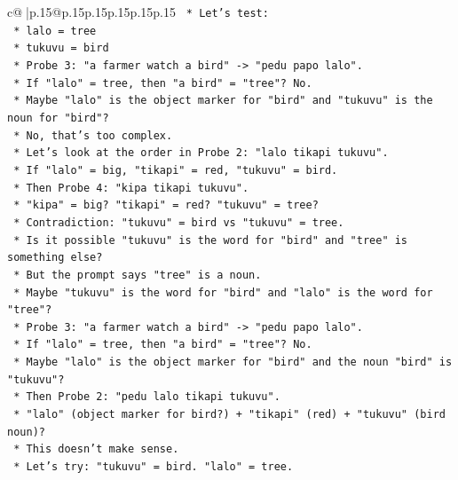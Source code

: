 \documentclass{article}
\begin{document}
{\begin{supertabular}{c@{$\;$}|p{.15\linewidth}@{}p{.15\linewidth}p{.15\linewidth}p{.15\linewidth}p{.15\linewidth}p{.15\linewidth}}
{{{\texttt{                *   Let's test:} \\
\texttt{                    *   lalo = tree} \\
\texttt{                    *   tukuvu = bird} \\
\texttt{                *   Probe 3: "a farmer watch a bird" {-}> "pedu papo lalo".} \\
\texttt{                    *   If "lalo" = tree, then "a bird" = "tree"? No.} \\
\texttt{                *   Maybe "lalo" is the object marker for "bird" and "tukuvu" is the noun for "bird"?} \\
\texttt{                *   No, that's too complex.} \\
\texttt{                *   Let's look at the order in Probe 2: "lalo tikapi tukuvu".} \\
\texttt{                *   If "lalo" = big, "tikapi" = red, "tukuvu" = bird.} \\
\texttt{                *   Then Probe 4: "kipa tikapi tukuvu".} \\
\texttt{                *   "kipa" = big? "tikapi" = red? "tukuvu" = tree?} \\
\texttt{                *   Contradiction: "tukuvu" = bird vs "tukuvu" = tree.} \\
\texttt{                *   Is it possible "tukuvu" is the word for "bird" and "tree" is something else?} \\
\texttt{                *   But the prompt says "tree" is a noun.} \\
\texttt{                *   Maybe "tukuvu" is the word for "bird" and "lalo" is the word for "tree"?} \\
\texttt{                *   Probe 3: "a farmer watch a bird" {-}> "pedu papo lalo".} \\
\texttt{                    *   If "lalo" = tree, then "a bird" = "tree"? No.} \\
\texttt{                *   Maybe "lalo" is the object marker for "bird" and the noun "bird" is "tukuvu"?} \\
\texttt{                *   Then Probe 2: "pedu lalo tikapi tukuvu".} \\
\texttt{                    *   "lalo" (object marker for bird?) + "tikapi" (red) + "tukuvu" (bird noun)?} \\
\texttt{                    *   This doesn't make sense.} \\
\texttt{                *   Let's try: "tukuvu" = bird. "lalo" = tree.} \\
}}}
\end{supertabular}}
\end{document}
